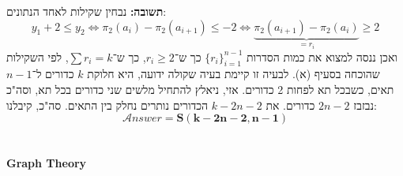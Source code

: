 \documentclass[]{article}
\newcommand\sen   {\begin{otherlanguage}{english}}
\newcommand\she   {\end{otherlanguage}}
\newcommand\ans   {\mathscr{A}\!\mathit{nswer}}
\begin{document}
\begin{enumerate}[(A)]
		\textbf{תשובה: }נבחין שקילות לאחד הנתונים: 
		\[ y_1 + 2 \le y_2 \iff \pi_2(a_i) - \pi_2(a_{i + 1}) \le -2 \iff \underbrace{\pi_2(a_{i + 1}) - \pi_2(a_i)}_{=r_i} \ge 2 \]
		ואכן ננסה למצוא את כמות הסדרות $\{r_i\}_{i = 1}^{n - 1}$ כך ש־$r_i \ge 2$, כך ש־$\sum r_i = k$, לפי השקילות שהוכחה בסעיף (א). לבעיה זו קיימת בעיה שקולה ידועה, היא חלוקת $k$ כדורים ל־$n - 1$ תאים, כשבכל תא לפחות 2 כדורים. אזי, ניאלץ להתחיל מלשים שני כדורים בכל תא, וסה"כ נבזבז $2n - 2$ כדורים. את $k - 2n - 2$ הכדורים נותרים נחלק בין התאים. סה"כ, קיבלנו: 
		\[ \ans = \bm{S(k - 2n - 2, n - 1)} \]
	\end{enumerate}
	\section{}
	\section{}
	\section{}
	
	\setcounter{section}{0}
	{\Large \sen\hfill \textbf{Graph Theory} \hfill\she}
	
	\section{}
	\section{}
	\section{}
	\section{}
	\section{}
	\section{}
	\section{}
	\section{}
	\section{}
	\section{}
	
\end{document}
